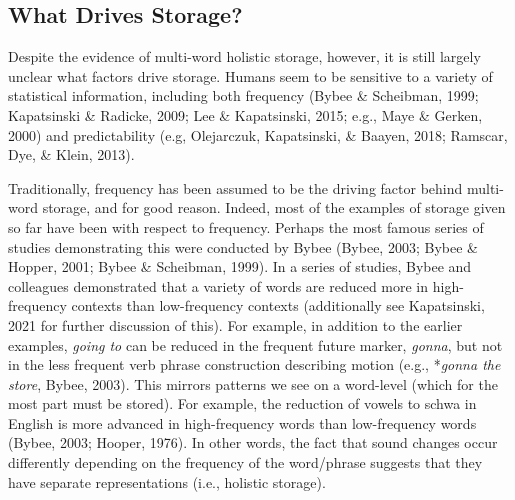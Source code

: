 \documentclass[
  man,floatsintext]{apa6}
\begin{document}
\subsection{What Drives Storage?}\label{what-drives-storage}

Despite the evidence of multi-word holistic storage, however, it is still largely unclear what factors drive storage. Humans seem to be sensitive to a variety of statistical information, including both frequency (Bybee \& Scheibman, 1999; Kapatsinski \& Radicke, 2009; Lee \& Kapatsinski, 2015; e.g., Maye \& Gerken, 2000) and predictability (e.g, Olejarczuk, Kapatsinski, \& Baayen, 2018; Ramscar, Dye, \& Klein, 2013).

Traditionally, frequency has been assumed to be the driving factor behind multi-word storage, and for good reason. Indeed, most of the examples of storage given so far have been with respect to frequency. Perhaps the most famous series of studies demonstrating this were conducted by Bybee (Bybee, 2003; Bybee \& Hopper, 2001; Bybee \& Scheibman, 1999). In a series of studies, Bybee and colleagues demonstrated that a variety of words are reduced more in high-frequency contexts than low-frequency contexts (additionally see Kapatsinski, 2021 for further discussion of this). For example, in addition to the earlier examples, \emph{going to} can be reduced in the frequent future marker, \emph{gonna}, but not in the less frequent verb phrase construction describing motion (e.g., *\emph{gonna the store}, Bybee, 2003). This mirrors patterns we see on a word-level (which for the most part must be stored). For example, the reduction of vowels to schwa in English is more advanced in high-frequency words than low-frequency words (Bybee, 2003; Hooper, 1976). In other words, the fact that sound changes occur differently depending on the frequency of the word/phrase suggests that they have separate representations (i.e., holistic storage).
\end{document}
